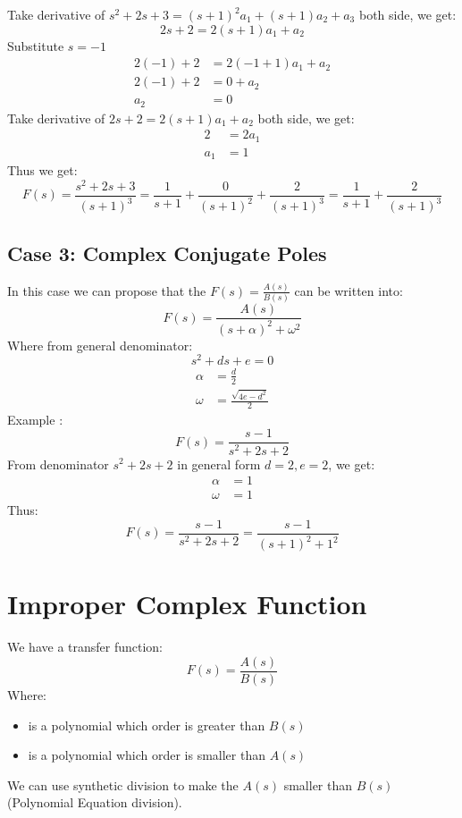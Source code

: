 \documentclass[12pt,a4paper]{article}
\begin{document}
	Take derivative of \(s^2+2s+3 = (s+1)^2a_1+(s+1)a_2+a_3\) both side, we get:
	\[
	2s+2 = 2(s+1)a_1+a_2
	\]
	Substitute \(s = -1\)
	\[
	\begin{split}
		2(-1)+2 &= 2(-1+1)a_1+a_2 \\
		2(-1)+2 &= 0+a_2 \\
		a_2 &= 0
	\end{split}
	\]
	Take derivative of \(2s+2 = 2(s+1)a_1+a_2\) both side, we get:
	\[
	\begin{split}
		2 &= 2a_1 \\
		a_1 &= 1
	\end{split}
	\]
	Thus we get:
	\[
	\boxed{
		F(s) = \frac{s^2+2s+3}{(s+1)^3} = \frac{1}{s+1} + \frac{0}{(s+1)^2} + \frac{2}{(s+1)^3} = \frac{1}{s+1} + \frac{2}{(s+1)^3}}
	\]
	
	

	\subsection{Case 3: Complex Conjugate Poles}
	In this case we can propose that the \(F(s) = \frac{A(s)}{B(s)}\) can be written into:
	\[
	F(s) = \frac{A(s)}{(s+\alpha)^2+\omega^2}
	\]
	Where from general denominator:
	\[
	s^2 + ds + e = 0
	\]
	\[
	\begin{split}
		\alpha &= \frac{d}{2} \\
		\omega &= \frac{\sqrt{4e-d^2}}{2}
	\end{split}
	\]
	Example :
	\[
	F(s) = \frac{s-1}{s^2+2s+2}
	\]
	From denominator \(s^2+2s+2\) in general form \(d = 2, e = 2\), we get:
	\[
	\begin{split}
		\alpha &= 1 \\
		\omega &= 1
	\end{split}
	\]
	Thus:
	\[\boxed{
	F(s) = \frac{s-1}{s^2+2s+2} = \frac{s-1}{(s+1)^2+1^2}}
	\]
	\section{Improper Complex Function}
	We have a transfer function:
	\[
	F(s) = \frac{A(s)}{B(s)}
	\]
	Where:
	\begin{itemize}
		\item { is a polynomial which order is greater than \(B(s)\)}
		\item { is a polynomial which order is smaller than \(A(s)\)}
	\end{itemize}
	We can use synthetic division to make the \(A(s)\) smaller than \(B(s)\) (Polynomial Equation division).

	
\end{document}
